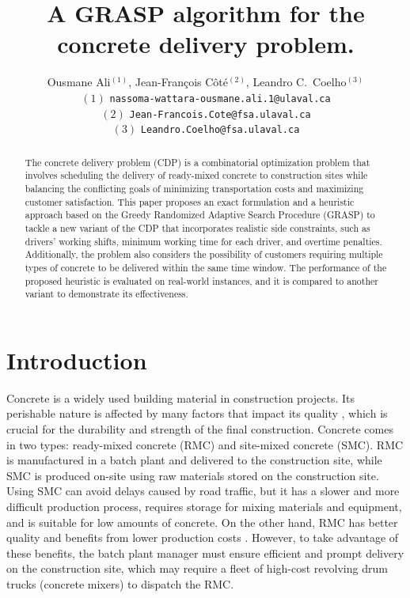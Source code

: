 \documentclass{article}
\title{A GRASP algorithm for the concrete delivery problem. }
\author{Ousmane Ali$^{(1)}$, Jean-Fran\c cois C\^ot\'e$^{(2)}$, Leandro C.~Coelho$^{(3)}$\\
 $(1)$ {\tt nassoma-wattara-ousmane.ali.1@ulaval.ca}\\
 $(2)$ {\tt Jean-Francois.Cote@fsa.ulaval.ca}\\
 $(3)$ {\tt Leandro.Coelho@fsa.ulaval.ca}\\
}
\begin{document}
\maketitle
\begin{abstract}
    The concrete delivery problem (CDP) is a combinatorial optimization problem that involves scheduling the delivery of ready-mixed concrete to construction sites while balancing the conflicting goals of minimizing transportation costs and maximizing customer satisfaction. This paper proposes an exact formulation and a heuristic approach based on the Greedy Randomized Adaptive Search Procedure (GRASP) to tackle a new variant of the CDP that incorporates realistic side constraints, such as drivers' working shifts, minimum working time for each driver, and overtime penalties. Additionally, the problem also considers the possibility of customers requiring multiple types of concrete to be delivered within the same time window. The performance of the proposed heuristic is evaluated on real-world instances, and it is compared to another variant to demonstrate its effectiveness.

\end{abstract}



\section{Introduction}
\label{sec:intro}
Concrete is a widely used building material in construction projects. Its perishable nature is affected by many factors that impact its quality \citep{sinha_quality_2021}, which is crucial for the durability and strength of the final construction. Concrete comes in two types: ready-mixed concrete (RMC) and site-mixed concrete (SMC). RMC is manufactured in a batch plant and delivered to the construction site, while SMC is produced on-site using raw materials stored on the construction site. Using SMC can avoid delays caused by road traffic, but it has a slower and more difficult production process, requires storage for mixing materials and equipment, and is suitable for low amounts of concrete. On the other hand, RMC has better quality and benefits from lower production costs \citep{muresan_comparing}. However, to take advantage of these benefits, the batch plant manager must ensure efficient and prompt delivery on the construction site, which may require a fleet of high-cost revolving drum trucks (concrete mixers) to dispatch the RMC.
\end{document}
